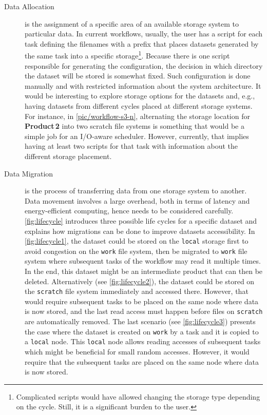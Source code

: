 \documentclass{superfri}
\begin{document}
\begin{description}

\item[Data Allocation] is the assignment of a specific area of an available storage system to particular data.
In current workflows, usually, the user has a script for each task defining the filenames with a prefix that places datasets generated by the same task into a specific storage\footnote{Complicated scripts would have allowed changing the storage type depending on the cycle. Still, it is a significant burden to the user.}.
Because there is one script responsible for generating the configuration, the decision in which directory the dataset will be stored is somewhat fixed.
Such configuration is done manually and with restricted information about the system architecture.
It would be interesting to explore storage options for the datasets and, e.g., having datasets from different cycles placed at different storage systems.
For instance, in \cref{pic/workflow-s3-n}, alternating the storage location for \textbf{Product\,2} into two scratch file systems is something that would be a simple job for an I/O-aware scheduler.
However, currently, that implies having at least two scripts for that task with information about the different storage placement.

\item[Data Migration] is the process of transferring data from one storage system to another.
Data movement involves a large overhead, both in terms of latency and energy-efficient computing, hence needs to be considered carefully.
\cref{fig:lifecycle} introduces three possible life cycles for a specific dataset and explains how migrations can be done to improve datasets accessibility.
In \cref{fig:lifecycle1}, the dataset could be stored on the \texttt{local} storage first to avoid congestion on the \texttt{work} file system, then be migrated to \texttt{work} file system where subsequent tasks of the workflow may read it multiple times.
In the end, this dataset might be an intermediate product that can then be deleted.
Alternatively (see \cref{fig:lifecycle2}), the dataset could be stored on the \texttt{scratch} file system immediately and accessed there.
However, that would require subsequent tasks to be placed on the same node where data is now stored, and the last read access must happen before files on \texttt{scratch} are automatically removed.
The last scenario (see \cref{fig:lifecycle3}) presents the case where the dataset is created on \texttt{work} by a task and it is copied to a \texttt{local} node.
This \texttt{local} node allows reading accesses of subsequent tasks which might be beneficial for small random accesses.
However, it would require that the subsequent tasks are placed on the same node where data is now stored.


\end{description}
\end{document}
